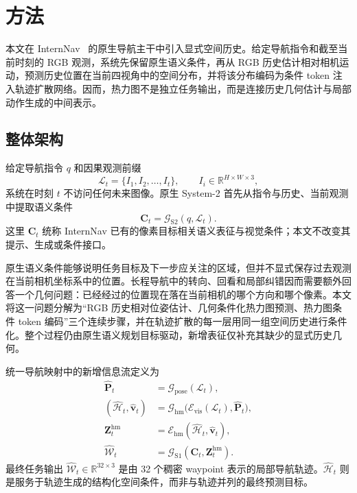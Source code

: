 \documentclass[10pt]{ctexart}
\begin{document}
\setcounter{section}{2}
\section{方法}

本文在 InternNav~\cite{internnav} 的原生导航主干中引入显式空间历史。给定导航指令和截至当前时刻的 RGB 观测，系统先保留原生语义条件，再从 RGB 历史估计相对相机运动，预测历史位置在当前四视角中的空间分布，并将该分布编码为条件 token 注入轨迹扩散网络。因而，热力图不是独立任务输出，而是连接历史几何估计与局部动作生成的中间表示。

\subsection{整体架构}

给定导航指令 $q$ 和因果观测前缀
\begin{equation}
  \mathcal{L}_{t}=\{I_{1},I_{2},\ldots,I_{t}\},
  \qquad I_i\in\mathbb{R}^{H\times W\times 3},
\end{equation}
系统在时刻 $t$ 不访问任何未来图像。原生 System-2 首先从指令与历史、当前观测中提取语义条件
\begin{equation}
  \mathbf{C}_{t}=\mathcal{G}_{\mathrm{S2}}(q,\mathcal{L}_{t}).
\end{equation}
这里 $\mathbf{C}_{t}$ 统称 InternNav 已有的像素目标相关语义表征与视觉条件；本文不改变其提示、生成或条件接口。

原生语义条件能够说明任务目标及下一步应关注的区域，但并不显式保存过去观测在当前相机坐标系中的位置。长程导航中的转向、回看和局部纠错因而需要额外回答一个几何问题：已经经过的位置现在落在当前相机的哪个方向和哪个像素。本文将这一问题分解为“RGB 历史相对位姿估计、几何条件化热力图预测、热力图条件 token 编码”三个连续步骤，并在轨迹扩散的每一层用同一组空间历史进行条件化。整个过程仍由原生语义规划目标驱动，新增表征仅补充其缺少的显式历史几何。

统一导航映射中的新增信息流定义为
\begin{align}
  \widehat{\mathbf{P}}_{t}
  &=\mathcal{G}_{\mathrm{pose}}(\mathcal{L}_{t}), \\
  (\widehat{\mathcal{H}}_{t},\widehat{\mathbf{v}}_{t})
  &=\mathcal{G}_{\mathrm{hm}}
    \bigl(\mathcal{E}_{\mathrm{vis}}(\mathcal{L}_{t}),
    \widehat{\mathbf{P}}_{t}\bigr), \\
  \mathbf{Z}^{\mathrm{hm}}_{t}
  &=\mathcal{E}_{\mathrm{hm}}
    (\widehat{\mathcal{H}}_{t},\widehat{\mathbf{v}}_{t}), \\
  \widehat{\mathcal{W}}_{t}
  &=\mathcal{G}_{\mathrm{S1}}
    (\mathbf{C}_{t},\mathbf{Z}^{\mathrm{hm}}_{t}).
\end{align}
最终任务输出 $\widehat{\mathcal{W}}_{t}\in\mathbb{R}^{32\times3}$ 是由 32 个稠密 waypoint 表示的局部导航轨迹。$\widehat{\mathcal{H}}_{t}$ 则是服务于轨迹生成的结构化空间条件，而非与轨迹并列的最终预测目标。
\end{document}
